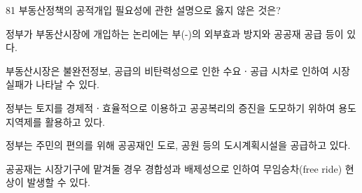 \begin{question}{81}
부동산정책의 공적개입 필요성에 관한 설명으로 옳지 않은 것은?
\begin{choices}
  \item 정부가 부동산시장에 개입하는 논리에는 부(-)의 외부효과 방지와 공공재 공급 등이 있다.
  \item 부동산시장은 불완전정보, 공급의 비탄력성으로 인한 수요ㆍ공급 시차로 인하여 시장실패가 나타날 수 있다.
  \item 정부는 토지를 경제적ㆍ효율적으로 이용하고 공공복리의 증진을 도모하기 위하여 용도지역제를 활용하고 있다.
  \item 정부는 주민의 편의를 위해 공공재인 도로, 공원 등의 도시계획시설을 공급하고 있다.
  \item 공공재는 시장기구에 맡겨둘 경우 경합성과 배제성으로 인하여 무임승차(free ride) 현상이 발생할 수 있다.
\end{choices}
\end{question}
